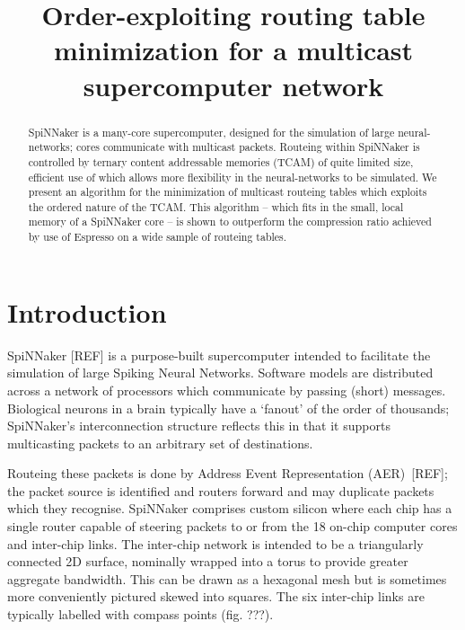 \documentclass[conference]{IEEEtran}
\title{Order-exploiting routing table minimization for a multicast supercomputer network}
\author{%
  \IEEEauthorblockN{Andrew~Mundy and Jim~D.~Garside}
  \IEEEauthorblockA{\{\texttt{andrew.mundy}, \texttt{jim.garside}\}\texttt{@manchester.ac.uk}\\
                    School of Computer Science,\\
		    University of Manchester,\\
                    M13 9PL, UK}
}
\begin{document}
  \maketitle

  \begin{abstract}
SpiNNaker is a many-core supercomputer, designed for the simulation of large neural-networks; cores communicate with multicast packets.
Routeing within SpiNNaker is controlled by ternary content addressable memories (TCAM) of quite limited size, efficient use of which allows more flexibility in the neural-networks to be simulated.
We present an algorithm for the minimization of multicast routeing tables which exploits the ordered nature of the TCAM.
This algorithm -- which fits in the small, local memory of a SpiNNaker core -- is shown to outperform the compression ratio achieved by use of Espresso on a wide sample of routeing tables.

  \end{abstract}

  \section{Introduction}

SpiNNaker [REF] is a purpose-built supercomputer intended to facilitate the simulation of large Spiking Neural Networks.
Software models are distributed across a network of processors which communicate by passing (short) messages.
Biological neurons in a brain typically have a `fanout' of the order of thousands; SpiNNaker's interconnection structure reflects this in that it supports multicasting packets to an arbitrary set of destinations.

Routeing these packets is done by Address Event Representation (AER)~[REF]; the packet source is identified and routers forward and may duplicate packets which they recognise.
SpiNNaker comprises custom silicon where each chip has a single router capable of steering packets to or from the 18 on-chip computer cores and inter-chip links.
The inter-chip network is intended to be a triangularly connected 2D surface, nominally wrapped into a torus to provide greater aggregate bandwidth.
This can be drawn as a hexagonal mesh but is sometimes more conveniently pictured skewed into squares.
The six inter-chip links are typically labelled with compass points (fig. ???).
\end{document}
